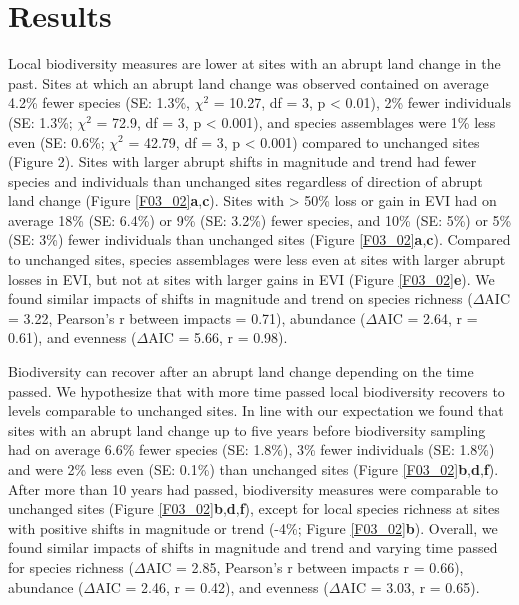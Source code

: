 \section{Results}
\label{C03_03}
Local biodiversity measures are lower at sites with an abrupt land change in the past. Sites at which an abrupt land change was observed contained on average 4.2\% fewer species (SE: 1.3\%, $\chi^2$ = 10.27, df = 3, p < 0.01), 2\% fewer individuals (SE: 1.3\%; $\chi^2$ = 72.9, df = 3, p < 0.001), and species assemblages were 1\% less even (SE: 0.6\%; $\chi^2$ = 42.79, df = 3, p < 0.001) compared to unchanged sites (Figure 2). Sites with larger abrupt shifts in magnitude and trend had fewer species and individuals than unchanged sites regardless of direction of abrupt land change (Figure \ref{F03_02}\textbf{a},\textbf{c}). Sites with > 50\% loss or gain in EVI had on average 18\% (SE: 6.4\%) or 9\% (SE: 3.2\%) fewer species, and 10\% (SE: 5\%) or 5\% (SE: 3\%) fewer individuals than unchanged sites (Figure \ref{F03_02}\textbf{a},\textbf{c}). Compared to unchanged sites, species assemblages were less even at sites with larger abrupt losses in EVI, but not at sites with larger gains in EVI (Figure \ref{F03_02}\textbf{e}). We found similar impacts of shifts in magnitude and trend on species richness ($\Delta$AIC = 3.22, Pearson’s r between impacts = 0.71), abundance ($\Delta$AIC = 2.64, r = 0.61), and evenness ($\Delta$AIC = 5.66, r = 0.98).

Biodiversity can recover after an abrupt land change depending on the time passed. We hypothesize that with more time passed local biodiversity recovers to levels comparable to unchanged sites. In line with our expectation we found that sites with an abrupt land change up to five years before biodiversity sampling had on average 6.6\% fewer species (SE: 1.8\%), 3\% fewer individuals (SE: 1.8\%) and were 2\% less even (SE: 0.1\%) than unchanged sites (Figure \ref{F03_02}\textbf{b},\textbf{d},\textbf{f}). After more than 10 years had passed, biodiversity measures were comparable to unchanged sites (Figure \ref{F03_02}\textbf{b},\textbf{d},\textbf{f}), except for local species richness at sites with positive shifts in magnitude or trend (-4\%; Figure \ref{F03_02}\textbf{b}). Overall, we found similar impacts of shifts in magnitude and trend and varying time passed for species richness ($\Delta$AIC = 2.85, Pearson’s r between impacts r = 0.66), abundance ($\Delta$AIC = 2.46, r = 0.42), and evenness ($\Delta$AIC = 3.03, r = 0.65).

